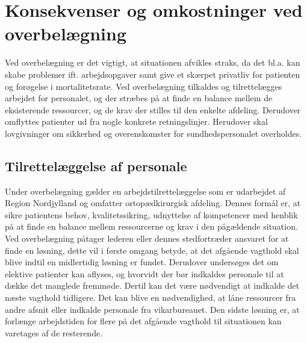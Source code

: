 





\section{Konsekvenser og omkostninger ved overbelægning}
Ved overbelægning er det vigtigt, at situationen afvikles straks, da det bl.a. kan skabe problemer ift. arbejdsopgaver samt give et skærpet privatliv for patienten og forøgelse i mortalitetsrate. \cite{Madsen2014}
Ved overbelægning tilkaldes og tilrettelægges arbejdet for personalet, og der stræbes på at finde en balance mellem de eksisterende ressourcer, og de krav der stilles til den enkelte afdeling. \cite{Bjerg2016} Derudover omflyttes  patienter ud fra nogle konkrete retningslinjer. \cite{Beredskab2016} Herudover skal lovgivninger om sikkerhed og overenskomster for sundhedspersonalet overholdes. \cite{Beredskab2016}


\subsection{Tilrettelæggelse af personale}
Under overbelægning gælder en arbejdstilrettelæggelse som er udarbejdet af Region Nordjylland og omfatter ortopædkirurgisk afdeling. Dennes formål er, at sikre patientens behov, kvalitetssikring, udnyttelse af kompetencer med henblik på at finde en balance mellem ressourcerne og krav i den pågældende situation. Ved overbelægning påtager lederen eller dennes stedfortræder ansvaret for at finde en løsning, dette vil i første omgang betyde, at det afgående vagthold skal blive indtil en midlertidig løsning er fundet. Derudover undersøges det om elektive patienter kan aflyses, og hvorvidt der bør indkaldes personale til at dække det manglede fremmøde. Dertil kan det være nødvendigt at indkalde det næste vagthold tidligere. Det kan blive en nødvendighed, at låne ressourcer fra andre afsnit eller indkalde personale fra vikarbureauet. Den sidste løsning er, at forlænge arbejdstiden for flere på det afgående vagthold til situationen kan varetages af de resterende. \cite{Bjerg2016}

